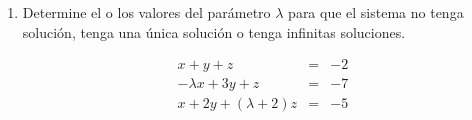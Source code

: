 \documentclass[12pt]{article}
\theoremstyle{exampstyle}
\theoremstyle{definition}
\theoremstyle{break}
\numberwithin{equation}{section}
\begin{document}
\begin{enumerate}
\item Determine el o los valores del parámetro $\lambda$ para que el sistema no tenga solución, tenga una \'unica soluci\'on o tenga infinitas soluciones.



\begin{eqnarray*}
x + y +z &=& -2 \\
-\lambda x +3y + z &=& -7 \\
x+2 y + (\lambda +2)z &=& -5 \\
\end{eqnarray*}


    



\end{enumerate}
\end{document}
